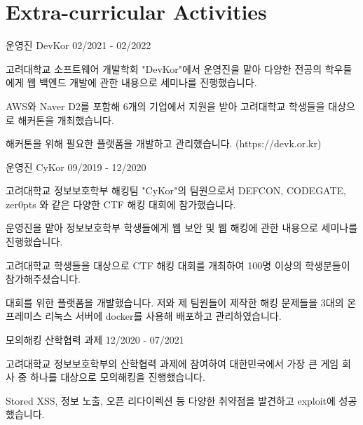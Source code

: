 \section{Extra-curricular Activities}

\cventry
{운영진} %
{DevKor} %
{} %
{02/2021 - 02/2022} %
\begin{cvitems}
\item {고려대학교 소프트웨어 개발학회 "DevKor"에서 운영진을 맡아 다양한 전공의 학우들에게 웹 백엔드 개발에 관한 내용으로 세미나를 진행했습니다.}
\item {AWS와 Naver D2를 포함해 6개의 기업에서 지원을 받아 고려대학교 학생들을 대상으로 해커톤을 개최했습니다.}
\item {해커톤을 위해 필요한 플랫폼을 개발하고 관리했습니다. (https://devk.or.kr)}
\end{cvitems}

\cventry
{운영진} %
{CyKor} %
{} %
{09/2019 - 12/2020} %
\begin{cvitems}
\item {고려대학교 정보보호학부 해킹팀 "CyKor"의 팀원으로서 DEFCON, CODEGATE, zer0pts 와 같은 다양한 CTF 해킹 대회에 참가했습니다.}
\item {운영진을 맡아 정보보호학부 학생들에게 웹 보안 및 웹 해킹에 관한 내용으로 세미나를 진행했습니다.}
\item {고려대학교 학생들을 대상으로 CTF 해킹 대회를 개최하여 100명 이상의 학생분들이 참가해주셨습니다.}
\item {대회를 위한 플랫폼을 개발했습니다. 저와 제 팀원들이 제작한 해킹 문제들을 3대의 온프레미스 리눅스 서버에 docker를 사용해 배포하고 관리하였습니다.}
\end{cvitems}

\cventry
{모의해킹} %
{산학협력 과제} %
{} %
{12/2020 - 07/2021} %
\begin{cvitems}
\item {고려대학교 정보보호학부의 산학협력 과제에 참여하여 대한민국에서 가장 큰 게임 회사 중 하나를 대상으로 모의해킹을 진행했습니다.}
\item {Stored XSS, 정보 노출, 오픈 리다이렉션 등 다양한 취약점을 발견하고 exploit에 성공했습니다.}
\end{cvitems}

